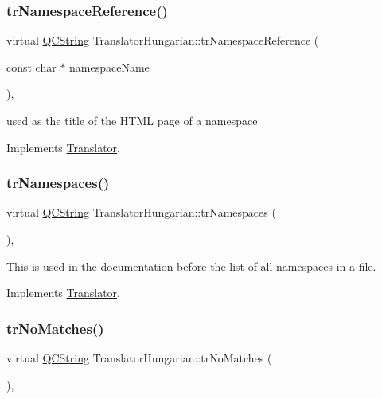 \subsubsection{\texorpdfstring{trNamespaceReference()}{trNamespaceReference()}}
{\footnotesize\ttfamily virtual \mbox{\hyperlink{class_q_c_string}{Q\+C\+String}} Translator\+Hungarian\+::tr\+Namespace\+Reference (\begin{DoxyParamCaption}\item[{const char $\ast$}]{namespace\+Name }\end{DoxyParamCaption})\hspace{0.3cm}{\ttfamily [inline]}, {\ttfamily [virtual]}}

used as the title of the H\+T\+ML page of a namespace 

Implements \mbox{\hyperlink{class_translator}{Translator}}.

\mbox{\label{class_translator_hungarian_a646ad8f617e4456057b2aa4fcc011b07}} 
\subsubsection{\texorpdfstring{trNamespaces()}{trNamespaces()}}
{\footnotesize\ttfamily virtual \mbox{\hyperlink{class_q_c_string}{Q\+C\+String}} Translator\+Hungarian\+::tr\+Namespaces (\begin{DoxyParamCaption}{ }\end{DoxyParamCaption})\hspace{0.3cm}{\ttfamily [inline]}, {\ttfamily [virtual]}}

This is used in the documentation before the list of all namespaces in a file. 

Implements \mbox{\hyperlink{class_translator}{Translator}}.

\mbox{\label{class_translator_hungarian_a88e3bf187b611a077ae31ee59c5431ba}} 
\subsubsection{\texorpdfstring{trNoMatches()}{trNoMatches()}}
{\footnotesize\ttfamily virtual \mbox{\hyperlink{class_q_c_string}{Q\+C\+String}} Translator\+Hungarian\+::tr\+No\+Matches (\begin{DoxyParamCaption}{ }\end{DoxyParamCaption})\hspace{0.3cm}{\ttfamily [inline]}, {\ttfamily [virtual]}}

